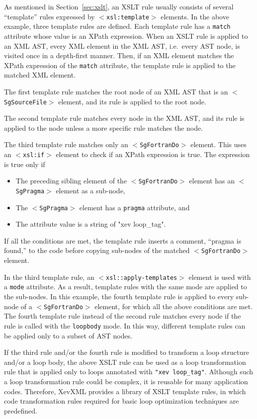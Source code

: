 As mentioned in Section~\ref{sec:xslt}, an XSLT rule usually consists of
several ``template'' rules expressed by \texttt{$<$xsl:template$>$}
elements. In the above example, three template rules are defined. Each
template rule has a \texttt{match} attribute whose value is an XPath
expression. When an XSLT rule is applied to an XML AST, every XML
element in the XML AST, i.e.~every AST node, is visited once in a
depth-first manner. Then, if an XML element matches the XPath expression
of the \texttt{match} attribute, the template rule is applied to the
matched XML element.

The first template rule matches the root node of an XML AST that is an
\texttt{$<$SgSourceFile$>$} element, and its rule is applied to the root
node.

The second template rule matches every node in the XML AST, and its rule
is applied to the node unless a more specific rule matches the node.

The third template rule matches only an \texttt{$<$SgFortranDo$>$}
element. This uses an \texttt{$<$xsl:if$>$} element to check if an XPath
expression is true. The expression is true only if
\begin{itemize}
 \item The preceding sibling element of the \texttt{$<$SgFortranDo$>$}
       element has an \texttt{$<$SgPragma$>$} element as a sub-node,
 \item The \texttt{$<$SgPragma$>$} element has a \texttt{pragma}
       attribute, and
 \item The attribute value is a string of "xev loop\_tag".
\end{itemize}
If all the conditions are met, the template rule inserts a comment,
``pragma is found,'' to the code before copying sub-nodes of the matched
\texttt{$<$SgFortranDo$>$} element.

In the third template rule, an \texttt{$<$xsl::apply-templates$>$}
element is used with a \texttt{mode} attribute. As a result, template
rules with the same mode are applied to the sub-nodes. In this example,
the fourth template rule is applied to every sub-node of a
\texttt{$<$SgFortranDo$>$} element, for which all the above conditions
are met. The fourth template rule instead of the second rule matches
every node if the rule is called with the \texttt{loopbody} mode. In
this way, different template rules can be applied only to a subset of
AST nodes.


If the third rule and/or the fourth rule is modified to transform a loop
structure and/or a loop body, the above XSLT rule can be used as a loop
transformation rule that is applied only to loops annotated with
\texttt{"xev loop\_tag"}. Although such a loop transformation rule could
be complex, it is reusable for many application codes.  Therefore,
XevXML provides a library of XSLT template rules, in which code
transformation rules required for basic loop optimization techniques are
predefined.


